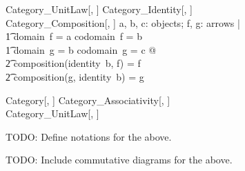 \documentclass{amsart}
\begin{document}
\begin{schema}{Category\_UnitLaw}[\genO, \genA]
	Category\_Identity[\genO, \genA] \\
	Category\_Composition[\genO, \genA]
\where
	\forall a, b, c: objects; f, g: arrows | \\
	\t1	domain~f = a \land codomain~f = b \land \\
	\t1	domain~g = b \land codomain~g = c @ \\
	\t2		composition(identity~b, f) = f \land \\
	\t2		composition(g, identity~b) = g
\end{schema}

\begin{schema}{Category}[\genO, \genA]
	Category\_Associativity[\genO, \genA] \\
	Category\_UnitLaw[\genO, \genA]
\end{schema}

TODO: Define notations for the above.

TODO: Include commutative diagrams for the above.

\printbibliography
\end{document}
